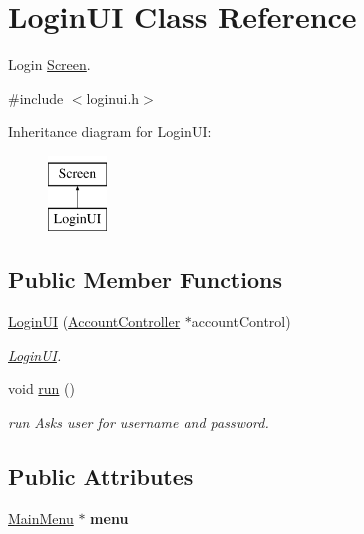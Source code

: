 \hypertarget{classLoginUI}{}\section{Login\+UI Class Reference}
\label{classLoginUI}


Login \hyperlink{classScreen}{Screen}.  




{\ttfamily \#include $<$loginui.\+h$>$}

Inheritance diagram for Login\+UI\+:\begin{figure}[H]
\begin{center}
\leavevmode
\includegraphics[height=2.000000cm]{classLoginUI}
\end{center}
\end{figure}
\subsection*{Public Member Functions}
\begin{DoxyCompactItemize}
\item 
\hyperlink{classLoginUI_a499c91383c83dac9929fd0f855bd7ce4}{Login\+UI} (\hyperlink{classAccountController}{Account\+Controller} $\ast$account\+Control)
\begin{DoxyCompactList}\small\item\em \hyperlink{classLoginUI}{Login\+UI}. \end{DoxyCompactList}\item 
void \hyperlink{classLoginUI_a118ca727f08f4430d0b7e8ae15c521dd}{run} ()
\begin{DoxyCompactList}\small\item\em run Asks user for username and password. \end{DoxyCompactList}\end{DoxyCompactItemize}
\subsection*{Public Attributes}
\begin{DoxyCompactItemize}
\item 
\hyperlink{classMainMenu}{Main\+Menu} $\ast$ {\bfseries menu}\hypertarget{classLoginUI_a46b43e48521a28e8aff9c867459aee43}{}\label{classLoginUI_a46b43e48521a28e8aff9c867459aee43}

\end{DoxyCompactItemize}


